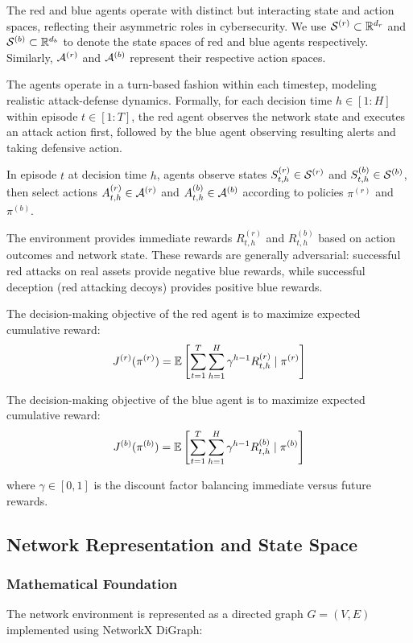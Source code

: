 \documentclass[11pt]{article}
\theoremstyle{definition}
\theoremstyle{plain}
\begin{document}
The red and blue agents operate with distinct but interacting state and action spaces, reflecting their asymmetric roles in cybersecurity. We use $\mathcal{S}^{(r)} \subset \mathbb{R}^{d_r}$ and $\mathcal{S}^{(b)} \subset \mathbb{R}^{d_b}$ to denote the state spaces of red and blue agents respectively. Similarly, $\mathcal{A}^{(r)}$ and $\mathcal{A}^{(b)}$ represent their respective action spaces.

The agents operate in a turn-based fashion within each timestep, modeling realistic attack-defense dynamics. Formally, for each decision time $h \in [1:H]$ within episode $t \in [1:T]$, the red agent observes the network state and executes an attack action first, followed by the blue agent observing resulting alerts and taking defensive action.

In episode $t$ at decision time $h$, agents observe states $S_{t,h}^{(r)} \in \mathcal{S}^{(r)}$ and $S_{t,h}^{(b)} \in \mathcal{S}^{(b)}$, then select actions $A_{t,h}^{(r)} \in \mathcal{A}^{(r)}$ and $A_{t,h}^{(b)} \in \mathcal{A}^{(b)}$ according to policies $\pi^{(r)}$ and $\pi^{(b)}$.

The environment provides immediate rewards $R_{t,h}^{(r)}$ and $R_{t,h}^{(b)}$ based on action outcomes and network state. These rewards are generally adversarial: successful red attacks on real assets provide negative blue rewards, while successful deception (red attacking decoys) provides positive blue rewards.

The decision-making objective of the red agent is to maximize expected cumulative reward:
\begin{equation}
J^{(r)}(\pi^{(r)}) = \mathbb{E}\left[\sum_{t=1}^{T} \sum_{h=1}^{H} \gamma^{h-1} R_{t,h}^{(r)} \mid \pi^{(r)}\right]
\end{equation}

The decision-making objective of the blue agent is to maximize expected cumulative reward:
\begin{equation}
J^{(b)}(\pi^{(b)}) = \mathbb{E}\left[\sum_{t=1}^{T} \sum_{h=1}^{H} \gamma^{h-1} R_{t,h}^{(b)} \mid \pi^{(b)}\right]
\end{equation}

where $\gamma \in [0,1]$ is the discount factor balancing immediate versus future rewards.

\subsection{Network Representation and State Space}

\subsubsection{Mathematical Foundation}
The network environment is represented as a directed graph $G = (V, E)$ implemented using NetworkX DiGraph:
\end{document}

